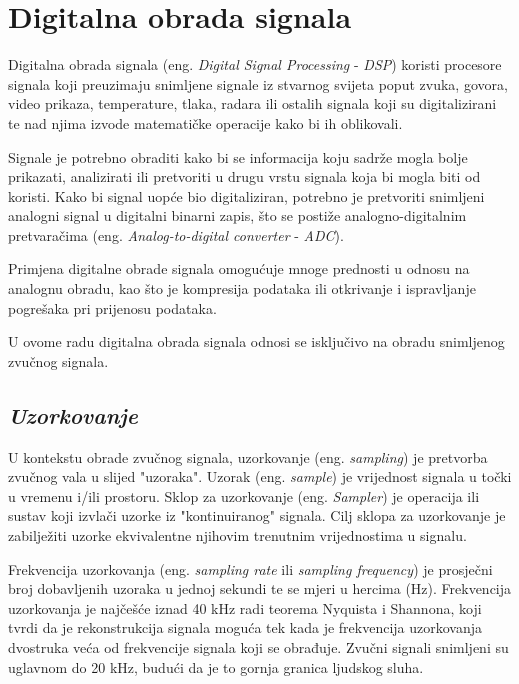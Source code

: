 \documentclass[times, utf8, zavrsni, numeric]{fer}
\begin{document}
%

\chapter{Digitalna obrada signala}
Digitalna obrada signala (eng. \textit{Digital Signal Processing} - \textit{DSP}) koristi procesore signala koji preuzimaju snimljene signale iz stvarnog svijeta poput zvuka, govora, video prikaza, temperature, tlaka, radara ili ostalih signala koji su digitalizirani te nad njima izvode matematičke operacije kako bi ih oblikovali.

Signale je potrebno obraditi kako bi se informacija koju sadrže mogla bolje prikazati, analizirati ili pretvoriti u drugu vrstu signala koja bi mogla biti od koristi. Kako bi signal uopće bio digitaliziran, potrebno je pretvoriti snimljeni analogni signal u digitalni binarni zapis, što se postiže analogno-digitalnim pretvaračima (eng. \textit{Analog-to-digital converter} - \textit{ADC}).

Primjena digitalne obrade signala omogućuje mnoge prednosti u odnosu na analognu obradu, kao što je kompresija podataka ili otkrivanje i ispravljanje pogrešaka pri prijenosu podataka.\cite{broesch2008digital}

U ovome radu digitalna obrada signala odnosi se isključivo na obradu snimljenog zvučnog signala.

\section{\textit{Uzorkovanje}}
U kontekstu obrade zvučnog signala, uzorkovanje (eng. \textit{sampling}) je pretvorba zvučnog vala u slijed "uzoraka". Uzorak (eng. \textit{sample}) je vrijednost signala u točki u vremenu i/ili prostoru. Sklop za uzorkovanje (eng. \textit{Sampler}) je operacija ili sustav koji izvlači uzorke iz "kontinuiranog" signala. Cilj sklopa za uzorkovanje je zabilježiti uzorke ekvivalentne njihovim trenutnim vrijednostima u signalu. 

Frekvencija uzorkovanja (eng. \textit{sampling rate} ili \textit{sampling frequency}) je prosječni broj dobavljenih uzoraka u jednoj sekundi te se mjeri u hercima (Hz). Frekvencija uzorkovanja je najčešće iznad 40 kHz radi teorema Nyquista i Shannona, koji tvrdi da je rekonstrukcija signala moguća tek kada je frekvencija uzorkovanja dvostruka veća od frekvencije signala koji se obrađuje.\cite{candes2008introduction} Zvučni signali snimljeni su uglavnom do 20 kHz, budući da je to gornja granica ljudskog sluha.
\end{document}
